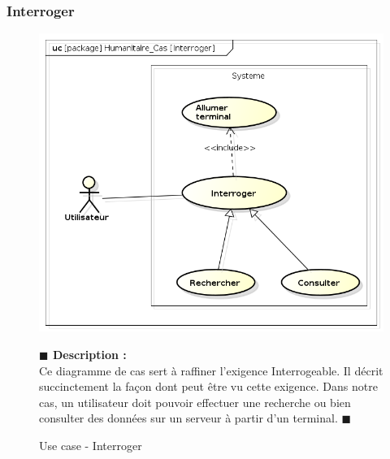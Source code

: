 \documentclass[11pt, titlepage]{report}
\newcommand{\debutDescription}{\noindent\textbf{\textcolor{DescriptionColor}{$\blacksquare$  Description : \\}}}
\newcommand{\finDescription}{\noindent\textcolor{DescriptionColor}{$\blacksquare$}}
\begin{document}
\subsubsection{Interroger}
\begin{figure}[h!]
\begin{center}
\includegraphics[scale=.4]{../images/diagrammes/sysml/use_case/interroger.png}
\end{center}
\caption{Use case - Interroger}
\debutDescription
Ce diagramme de cas sert à raffiner l'exigence Interrogeable. Il décrit succinctement la façon dont peut être vu cette exigence. Dans notre cas, un utilisateur doit pouvoir effectuer une recherche ou bien consulter des données sur un serveur à partir d'un terminal.
\finDescription
\end{figure}

\clearpage
\end{document}
